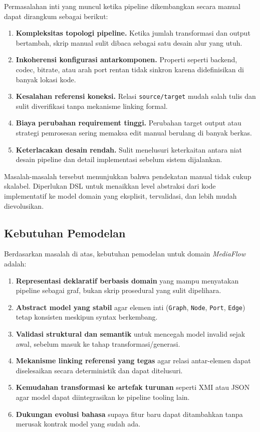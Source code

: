 Permasalahan inti yang muncul ketika pipeline dikembangkan secara manual dapat dirangkum sebagai berikut:
\begin{enumerate}
  \item \textbf{Kompleksitas topologi pipeline.} Ketika jumlah transformasi dan output bertambah, skrip manual sulit dibaca sebagai satu desain alur yang utuh.
  \item \textbf{Inkoherensi konfigurasi antarkomponen.} Properti seperti backend, codec, bitrate, atau arah port rentan tidak sinkron karena didefinisikan di banyak lokasi kode.
  \item \textbf{Kesalahan referensi koneksi.} Relasi \texttt{source/target} mudah salah tulis dan sulit diverifikasi tanpa mekanisme linking formal.
  \item \textbf{Biaya perubahan requirement tinggi.} Perubahan target output atau strategi pemrosesan sering memaksa edit manual berulang di banyak berkas.
  \item \textbf{Keterlacakan desain rendah.} Sulit menelusuri keterkaitan antara niat desain pipeline dan detail implementasi sebelum sistem dijalankan.
\end{enumerate}

Masalah-masalah tersebut menunjukkan bahwa pendekatan manual tidak cukup skalabel. Diperlukan DSL untuk menaikkan level abstraksi dari kode implementatif ke model domain yang eksplisit, tervalidasi, dan lebih mudah dievolusikan.

\subsection{Kebutuhan Pemodelan}

Berdasarkan masalah di atas, kebutuhan pemodelan untuk domain \textit{MediaFlow} adalah:
\begin{enumerate}
  \item \textbf{Representasi deklaratif berbasis domain} yang mampu menyatakan pipeline sebagai graf, bukan skrip prosedural yang sulit dipelihara.
  \item \textbf{Abstract model yang stabil} agar elemen inti (\texttt{Graph}, \texttt{Node}, \texttt{Port}, \texttt{Edge}) tetap konsisten meskipun syntax berkembang.
  \item \textbf{Validasi struktural dan semantik} untuk mencegah model invalid sejak awal, sebelum masuk ke tahap transformasi/generasi.
  \item \textbf{Mekanisme linking referensi yang tegas} agar relasi antar-elemen dapat diselesaikan secara deterministik dan dapat ditelusuri.
  \item \textbf{Kemudahan transformasi ke artefak turunan} seperti XMI atau JSON agar model dapat diintegrasikan ke pipeline tooling lain.
  \item \textbf{Dukungan evolusi bahasa} supaya fitur baru dapat ditambahkan tanpa merusak kontrak model yang sudah ada.
\end{enumerate}

